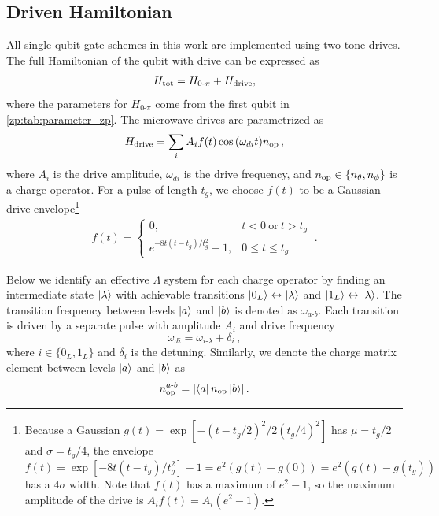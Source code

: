 \subsection{Driven Hamiltonian}\label{zp:sec:1q_drive}
All single-qubit gate schemes in this work are implemented using two-tone drives.
The full Hamiltonian of the qubit with drive can be expressed as
\begin{align}\label{zp:eq:H_total_and_drive_xgate}
    H_{\rm tot} = H_{0\text{-}\pi} + H_{\rm drive},
\end{align}
where the parameters for $H_{0\text{-}\pi}$ come from the first qubit in \cref{zp:tab:parameter_zp}.
The microwave drives are parametrized as
\begin{align} \label{zp:eq:zp_H_drive}
H_{\rm drive} = \sum_i {A_if(t)\cos{(\omega_{di} t)} n_{\rm op} } \, ,
\end{align}
where $A_i$ is the drive amplitude, $\omega_{di}$ is the drive frequency, and  $n_{\rm op} \in \left\{n_{\rm \theta}, n_{\rm \phi}\right\}$ is a charge operator.
For a pulse of length $t_g$, we choose $f(t)$ to be a Gaussian drive envelope\footnote{Because a Gaussian $g(t) = \exp[-(t-t_g/2)^2 / 2(t_g/4)^2] $ has $\mu=t_g/2$ and $\sigma = t_g/4$, the envelope $f(t) = \exp[-8t(t-t_g) / t_g^2] - 1 = e^2 (g(t) - g(0)) = e^2 (g(t) - g(t_g))$ has a $4\sigma$ width.
Note that $f(t)$ has a maximum of $e^2-1$, so the maximum amplitude of the drive is $A_i f(t)= A_i(e^2-1)$.}
\begin{align} \label{zp:eq:gauss_envelope}
f(t) =
\begin{cases}
  0, &  t < 0\ \text{or}\  t > t_g \\
  e^{-8t(t-t_g)/t_g^2}-1 , &  0 \leq t \leq t_g
\end{cases} ~.
\end{align}

Below we identify an effective $\Lambda$ system for each charge operator by finding an intermediate state $\ket{\lambda}$ with achievable transitions $\ket{0_L} \leftrightarrow \ket{\lambda}$ and $\ket{1_L} \leftrightarrow \ket{\lambda}$.
The transition frequency between levels $\ket{a}$ and $\ket{b}$ is denoted as $\omega_{a\text{-}b}$.
Each transition is driven by a separate pulse with amplitude $A_i$ and drive frequency
\begin{equation}
  \omega_{di} =  \omega_{i\text{-} \lambda}+\delta_{i}\, ,
\end{equation}
where $i \in \{ 0_L, 1_L\}$ and $\delta_{i}$ is the detuning.
Similarly, we denote the charge matrix element between levels $\ket{a}$ and $\ket{b}$ as
\begin{equation}
    n_{\rm op}^{a\text{-}b} = \left|\bra{a} n_{\rm op} \ket{b}\right|.
\end{equation}

